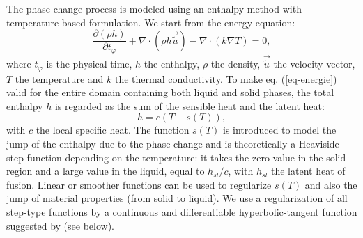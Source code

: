 The phase change process is modeled using an enthalpy method \citep{voller1987pcm,Cao1989,Cao1990} with temperature-based formulation. We start from the energy equation:
\begin{equation}
\label{eq-energie}
   \frac{\partial (\rho h)}{\partial t_{\varphi}} + \nabla \cdot(\rho h \vec{\tilde{u}}) - \nabla \cdot (k \nabla T) = 0,
\end{equation}
where $t_{\varphi}$ is the physical time, $h$ the enthalpy, $\rho$ the density, $\vec{\tilde{u}}$  the velocity vector, $T$ the temperature and $k$ the thermal conductivity. 
To make eq. (\ref{eq-energie})  valid for the entire domain containing both liquid and solid phases, the total enthalpy $h$ is regarded as the sum of the sensible heat and the latent heat:
\begin{equation}
\label{eq-enth-model}
  h = c ( T + s(T) ),
\end{equation} 
with $c$ the local specific heat. The function $s(T)$ is introduced to model the jump of the enthalpy due to the phase change and is theoretically a Heaviside step function depending on the temperature: it takes the zero value in the solid region and a large value in the liquid, equal to $h_{sl}/c$, with $h_{sl}$ the latent heat of fusion. 
Linear  \citep{voller1987pcm,Wang2010} or smoother functions \citep{dan-2014-JCP} can be used to regularize $s(T)$ and also the jump of material properties (from solid to liquid). 
We use a regularization of all step-type functions by a continuous and differentiable hyperbolic-tangent function suggested by \cite{dan-2014-JCP} (see below). 

